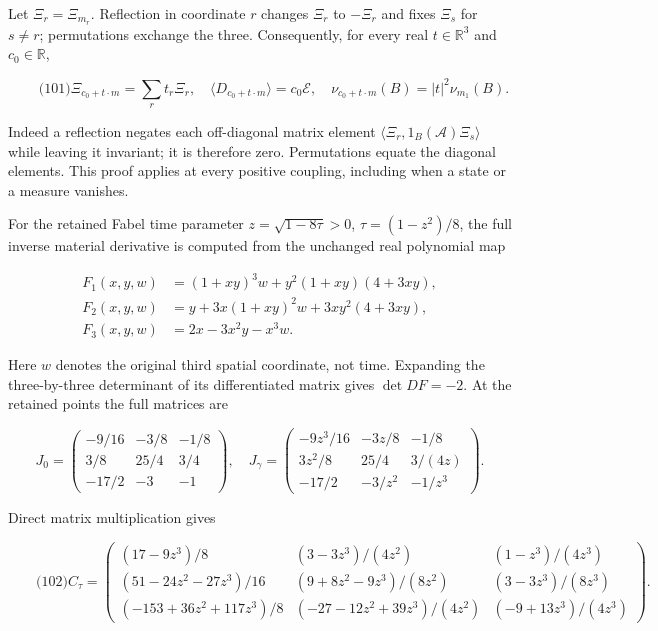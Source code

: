 Let \(\Xi_r=\Xi_{m_r}\). Reflection in coordinate \(r\) changes
\(\Xi_r\) to \(-\Xi_r\) and fixes \(\Xi_s\) for \(s\ne r\); permutations
exchange the three. Consequently, for every real \(t\in\mathbb R^3\) and
\(c_0\in\mathbb R\),

\[
\qquad\text{(101)}
 \Xi_{c_0+t\cdot m}=\sum_rt_r\Xi_r,\quad
 \langle D_{c_0+t\cdot m}\rangle=c_0\mathcal E,\quad
 \nu_{c_0+t\cdot m}(B)=|t|^2\nu_{m_1}(B).
\]

Indeed a reflection negates each off-diagonal matrix element
\(\langle\Xi_r,1_B(\mathcal A)\Xi_s\rangle\) while leaving it invariant;
it is therefore zero. Permutations equate the diagonal elements. This
proof applies at every positive coupling, including when a state or a
measure vanishes.

For the retained Fabel time parameter \(z=\sqrt{1-8\tau}>0\),
\(\tau=(1-z^2)/8\), the full inverse material derivative is computed
from the unchanged real polynomial map

\[
\begin{aligned}
 F_1(x,y,w)&=(1+xy)^3w+y^2(1+xy)(4+3xy),\\
 F_2(x,y,w)&=y+3x(1+xy)^2w+3xy^2(4+3xy),\\
 F_3(x,y,w)&=2x-3x^2y-x^3w .
\end{aligned}
\]

Here \(w\) denotes the original third spatial coordinate, not time.
Expanding the three-by-three determinant of its differentiated matrix
gives \(\det DF=-2\). At the retained points the full matrices are

\[
J_0=\begin{pmatrix}-9/16&-3/8&-1/8\\3/8&25/4&3/4\\-17/2&-3&-1\end{pmatrix},
 \quad
 J_\gamma=\begin{pmatrix}
 -9z^3/16&-3z/8&-1/8\\3z^2/8&25/4&3/(4z)\\-17/2&-3/z^2&-1/z^3
 \end{pmatrix}.
\]

Direct matrix multiplication gives

\[
\qquad\text{(102)}
 C_\tau=
 \begin{pmatrix}
 (17-9z^3)/8&(3-3z^3)/(4z^2)&(1-z^3)/(4z^3)\\
 (51-24z^2-27z^3)/16&(9+8z^2-9z^3)/(8z^2)&(3-3z^3)/(8z^3)\\
 (-153+36z^2+117z^3)/8&(-27-12z^2+39z^3)/(4z^2)&(-9+13z^3)/(4z^3)
 \end{pmatrix}.
\]

